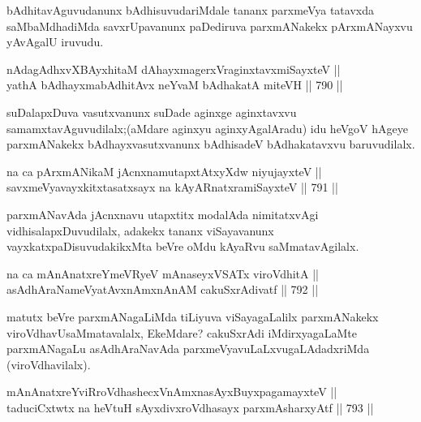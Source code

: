 \begin{artha}
bAdhitavAguvudanunx bAdhisuvudariMdale tananx parxmeVya tatavxda 
saMbaMdhadiMda savxrUpavanunx paDediruva parxmANakekx pArxmANayxvu yAvAgalU iruvudu.
\end{artha}


\begin{shl}
nAdagAdhxvX\s BAyxhitaM dAhayxmagerxVraginxtavxmiSayxteV || \\
yathA bAdhayxmabAdhitAvx neYvaM bAdhakatA miteVH \hfill || 790 ||  
\end{shl}

\begin{artha}
suDalapxDuva vasutxvanunx suDade aginxge aginxtavxvu samamxtavAguvudilalx;(aMdare aginxyu aginxyAgalAradu) idu heVgoV hAgeye parxmANakekx bAdhayxvasutxvanunx bAdhisadeV bAdhakatavxvu baruvudilalx.
\end{artha}


\begin{shl}
na ca pArxmANikaM jAcnxnamutapxtAtxyXdw niyujayxteV || \\
savxmeVyavayxkitxtasatxsayx na kAyARnatxramiSayxteV \hfill || 791 ||  
\end{shl}

\begin{artha}
parxmANavAda jAcnxnavu utapxtitx modalAda nimitatxvAgi vidhisalapxDuvudilalx, adakekx tananx viSayavanunx vayxkatxpaDisuvudakikxMta beVre oMdu kAyaRvu saMmatavAgilalx.
\end{artha}

\begin{shl}
na ca mAnAnatxreYmeVRyeV mAnaseyxVSATx viroVdhitA || \\
asAdhAraNameVyatAvxnAmxnAnAM cakuSxrAdivatf \hfill || 792 ||  
\end{shl}

\begin{artha}
matutx beVre parxmANagaLiMda tiLiyuva viSayagaLalilx parxmANakekx viroVdhavUsaMmatavalalx, EkeMdare? cakuSxrAdi iMdirxyagaLaMte parxmANagaLu asAdhAraNavAda parxmeVyavuLaLxvugaLAdadxriMda (viroVdhavilalx).
\end{artha}

\begin{shl}
mAnAnatxreYviRroVdhashecxVnAmxnasAyxBuyxpagamayxteV || \\
taduciCxtwtx na heVtuH sAyxdivxroVdhasayx parxmAsharxyAtf \hfill || 793 ||  
\end{shl}

